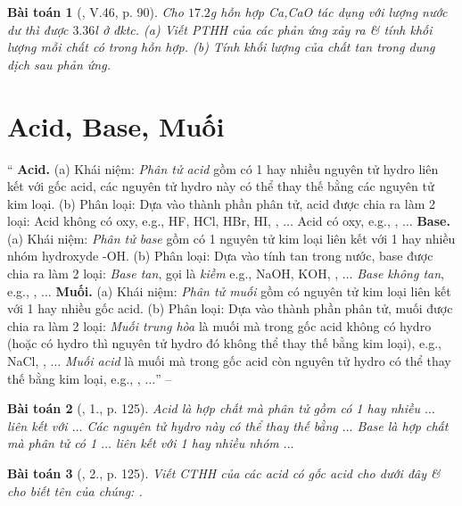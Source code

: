 \documentclass{article}
\newtheorem{baitoan}{Bài toán}
\begin{document}
\begin{baitoan}[\cite{Truong_BTNC_Hoa_Hoc_8_2022}, V.46, p. 90]
	Cho $17.2$\emph{g} hỗn hợp \emph{Ca,CaO} tác dụng với lượng nước dư thì được $3.36$\emph{l } ở đktc. (a) Viết PTHH của các phản ứng xảy ra \& tính khối lượng mỗi chất có trong hỗn hợp. (b) Tính khối lượng của chất tan trong dung dịch sau phản ứng.
\end{baitoan}


\section{Acid, Base, Muối}
`` \textsf{\textbf{Acid.}} (a) Khái niệm: \textit{Phân tử acid} gồm có 1 hay nhiều nguyên tử hydro liên kết với gốc acid, các nguyên tử hydro này có thể thay thế bằng các nguyên tử kim loại. (b) Phân loại: Dựa vào thành phần phân tử, acid được chia ra làm 2 loại: Acid không có oxy, e.g., HF, HCl, HBr, HI, , $\ldots$ Acid có oxy, e.g., , $\ldots$  \textsf{\textbf{Base.}} (a) Khái niệm: \textit{Phân tử base} gồm có 1 nguyên tử kim loại liên kết với 1 hay nhiều nhóm hydroxyde -OH. (b) Phân loại: Dựa vào tính tan trong nước, base được chia ra làm 2 loại: \textit{Base tan}, gọi là \textit{kiềm} e.g., NaOH, KOH, , $\ldots$ \textit{Base không tan}, e.g., , $\ldots$  \textsf{\textbf{Muối.}} (a) Khái niệm: \textit{Phân tử muối} gồm có nguyên tử kim loại liên kết với 1 hay nhiều gốc acid. (b) Phân loại: Dựa vào thành phần phân tử, muối được chia ra làm 2 loại: \textit{Muối trung hòa} là muối mà trong gốc acid không có hydro (hoặc có hydro thì nguyên tử hydro đó không thể thay thế bằng kim loại), e.g., NaCl, , $\ldots$ \textit{Muối acid} là muối mà trong gốc acid còn nguyên tử hydro có thể thay thế bằng kim loại, e.g., , $\ldots$'' -- \cite[Chap. 5, \S4, p. 91]{Truong_BTNC_Hoa_Hoc_8_2022}

\begin{baitoan}[\cite{SGK_Hoa_Hoc_8}, 1., p. 125]
	Acid là hợp chất mà phân tử gồm có 1 hay nhiều $\ldots$ liên kết với $\ldots$ Các nguyên tử hydro này có thể thay thế bằng $\ldots$ Base là hợp chất mà phân tử có 1 $\ldots$ liên kết với 1 hay nhiều nhóm $\ldots$
\end{baitoan}

\begin{baitoan}[\cite{SGK_Hoa_Hoc_8}, 2., p. 125]
	Viết CTHH của các acid có gốc acid cho dưới đây \& cho biết tên của chúng: \emph{}.
\end{baitoan}
\end{document}
